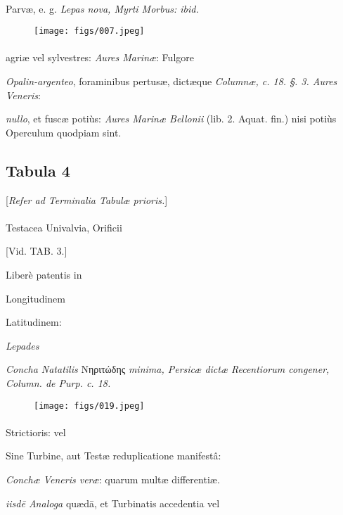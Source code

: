 \documentclass[a4paper, 11pt, oneside, polutonikogreek, german]{article}
\begin{document}
\paragraph{}
Parvæ, e. g. \emph{Lepas nova, Myrti Morbus: ibid.}
\begin{figure}[H]
\centering
\texttt{[image: figs/007.jpeg]}
\end{figure}
\paragraph{}
agriæ vel sylvestres: \emph{Aures Marinæ}: Fulgore

\emph{Opalin-argenteo}, foraminibus pertusæ, dictæque \emph{Columnæ, c. 18. §. 3. Aures Veneris}:

\emph{nullo}, et fuscæ potiùs: \emph{Aures Marinæ Bellonii} (lib. 2. Aquat. fin.) nisi potiùs Operculum quodpiam sint.
\clearpage
\subsection{Tabula 4}
\begin{center}
[\emph{Refer ad Terminalia Tabulæ prioris.}]
\end{center}
\paragraph{}
Testacea Univalvia, Orificii

[Vid. TAB. 3.]

Liberè patentis in

Longitudinem

Latitudinem:

\emph{Lepades}

\emph{Concha Natatilis} Νηριτώδης \emph{minima, Persicæ dictæ Recentiorum congener, Column. de Purp. c. 18.}
\begin{figure}[H]
\centering
\texttt{[image: figs/019.jpeg]}
\end{figure}
\paragraph{}
Strictioris: vel

Sine Turbine, aut Testæ reduplicatione manifestâ:

\emph{Conchæ Veneris veræ}: quarum multæ differentiæ.

\emph{iisdē Analoga} quædā, et Turbinatis accedentia vel
\end{document}
